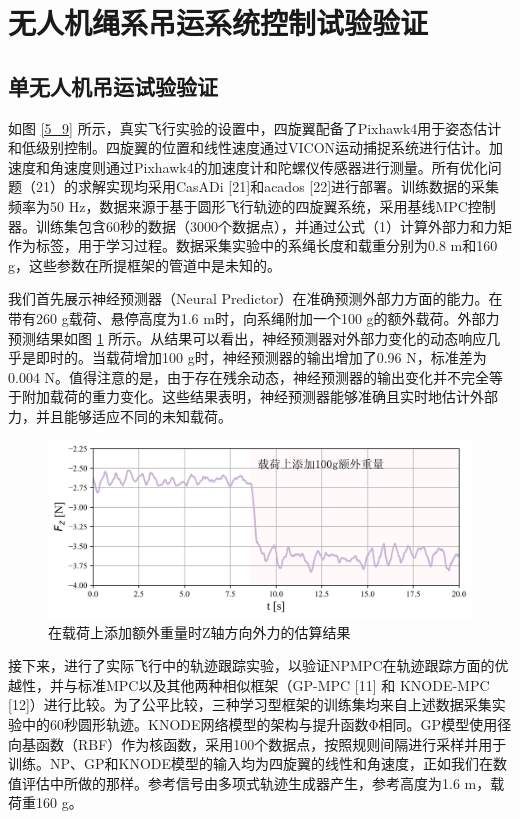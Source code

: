 \documentclass[lang=chs, degree=master, blindreview=false, winfonts=true]{yanputhesis}
\begin{document}
\section{无人机绳系吊运系统控制试验验证}
\subsection{单无人机吊运试验验证}
如图 \ref{5_9} 所示，真实飞行实验的设置中，四旋翼配备了Pixhawk4用于姿态估计和低级别控制。四旋翼的位置和线性速度通过VICON运动捕捉系统进行估计。加速度和角速度则通过Pixhawk4的加速度计和陀螺仪传感器进行测量。所有优化问题（21）的求解实现均采用CasADi [21]和acados [22]进行部署。训练数据的采集频率为50 Hz，数据来源于基于圆形飞行轨迹的四旋翼系统，采用基线MPC控制器。训练集包含60秒的数据（3000个数据点），并通过公式（1）计算外部力和力矩作为标签，用于学习过程。数据采集实验中的系绳长度和载重分别为0.8 m和160 g，这些参数在所提框架的管道中是未知的。

我们首先展示神经预测器（Neural Predictor）在准确预测外部力方面的能力。在带有260 g载荷、悬停高度为1.6 m时，向系绳附加一个100 g的额外载荷。外部力预测结果如图 \ref{force} 所示。从结果可以看出，神经预测器对外部力变化的动态响应几乎是即时的。当载荷增加100 g时，神经预测器的输出增加了0.96 N，标准差为0.004 N。值得注意的是，由于存在残余动态，神经预测器的输出变化并不完全等于附加载荷的重力变化。这些结果表明，神经预测器能够准确且实时地估计外部力，并且能够适应不同的未知载荷。

\begin{figure}[hbt!]
	\centering
	\includegraphics[width=38pc]{picture/kk/force.png} 
	\caption{在载荷上添加额外重量时Z轴方向外力的估算结果} 
	\label{force}
\end{figure}
接下来，进行了实际飞行中的轨迹跟踪实验，以验证NPMPC在轨迹跟踪方面的优越性，并与标准MPC以及其他两种相似框架（GP-MPC [11] 和 KNODE-MPC [12]）进行比较。为了公平比较，三种学习型框架的训练集均来自上述数据采集实验中的60秒圆形轨迹。KNODE网络模型的架构与提升函数Φ相同。GP模型使用径向基函数（RBF）作为核函数，采用100个数据点，按照规则间隔进行采样并用于训练。NP、GP和KNODE模型的输入均为四旋翼的线性和角速度，正如我们在数值评估中所做的那样。参考信号由多项式轨迹生成器产生，参考高度为1.6 m，载荷重160 g。
\end{document}
